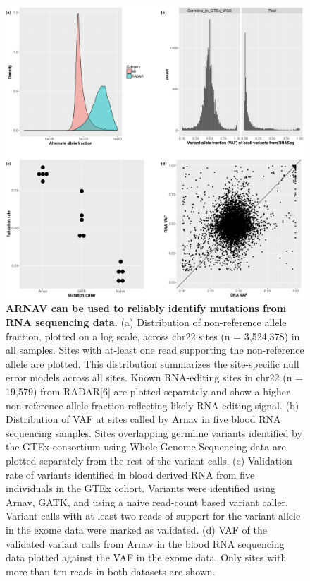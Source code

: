\begin{figure}[t!]  
    \centering
    \includegraphics[width=\linewidth]{figures/appendix/appendix_figure1.png}
    \caption[ARNAV can be used to reliably identify mutations from RNA sequencing data.]{\textbf{ARNAV can be used to reliably identify mutations from RNA sequencing data.}
    (​a​) Distribution of non-reference allele fraction, plotted on a log scale, across chr22 sites (n = 3,524,378) in all samples. Sites with at-least one read supporting the non-reference allele are plotted. This distribution summarizes the site-specific null error models across all sites. Known RNA-editing sites in chr22 (n = 19,579) from RADAR[6] are plotted separately and show a higher non-reference allele fraction reflecting likely RNA editing signal. (​b​) Distribution of VAF at sites called by Arnav in five blood RNA sequencing samples. Sites overlapping germline variants identified by the GTEx consortium using Whole Genome Sequencing data are plotted separately from the rest of the variant calls. (c) Validation rate of variants identified in blood derived RNA from five individuals in the GTEx cohort. Variants were identified using Arnav, GATK, and using a naive read-count based variant caller. Variant calls with at least two reads of support for the variant allele in the exome data were marked as validated. (d) VAF of the validated variant calls from Arnav in the blood RNA sequencing data plotted against the VAF in the exome data. Only sites with more than ten reads in both datasets are shown.
    }
    \label{fig:arnav_figure1}
\end{figure}


